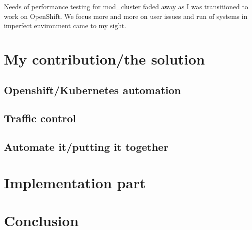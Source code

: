 \documentclass[
  master,
  biblatex,
  glossaries,
  index
]{kidiplom}
\begin{document}
Needs of performance testing for mod_cluster faded away as I was transitioned to work on OpenShift. We focus more and more on user issues and run of systems in imperfect environment came to my sight.


\section{My contribution/the solution}

\subsection{Openshift/Kubernetes automation}


\subsection{Traffic control}


\subsection{Automate it/putting it together}


\section{Implementation part}


\section{Conclusion}


\printbibliography
\end{document}
